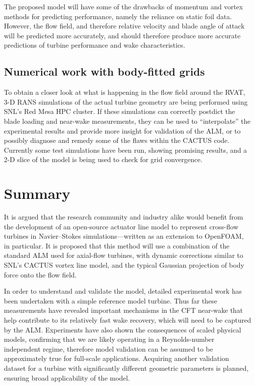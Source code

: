 The proposed model will have some of the drawbacks of momentum and vortex
methods for predicting performance, namely the reliance on static foil data.
However, the flow field, and therefore relative velocity and blade angle of
attack will be predicted more accurately, and should therefore produce more
accurate predictions of turbine performance and wake characteristics.

\subsection{Numerical work with body-fitted grids}

To obtain a closer look at what is happening in the flow field around the RVAT,
3-D RANS simulations of the actual turbine geometry are being performed using
SNL's Red Mesa HPC cluster. If these simulations can correctly postdict the
blade loading and near-wake measurements, they can be used to ``interpolate''
the experimental results and provide more insight for validation of the ALM, or
to possibly diagnose and remedy some of the flaws within the CACTUS code.
Currently some test simulations have been run, showing promising results, and a
2-D slice of the model is being used to check for grid convergence.


\section{Summary}

It is argued that the research community and industry alike would benefit from
the development of an open-source actuator line model to represent cross-flow
turbines in Navier--Stokes simulations---written as an extension to OpenFOAM, in
particular. It is proposed that this method will use a combination of the
standard ALM used for axial-flow turbines, with dynamic corrections similar to
SNL's CACTUS vortex line model, and the typical Gaussian projection of body
force onto the flow field.

In order to understand and validate the model, detailed experimental work has
been undertaken with a simple reference model turbine. Thus far these
measurements have revealed important mechanisms in the CFT near-wake that help
contribute to its relatively fast wake recovery, which will need to be captured
by the ALM. Experiments have also shown the consequences of scaled physical
models, confirming that we are likely operating in a Reynolds-number independent
regime, therefore model validation can be assumed to be approximately true for
full-scale applications. Acquiring another validation dataset for a turbine
with significantly different geometric parameters is planned, ensuring broad
applicability of the model.

